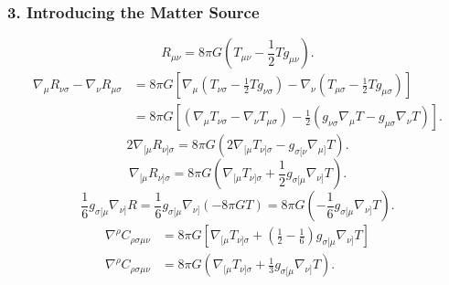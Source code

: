 \documentclass[11pt, a4paper]{report}
\begin{document}
\subsubsection*{3. Introducing the Matter Source}
\begin{equation}
R_{\mu\nu} = 8\pi G \left( T_{\mu\nu} - \frac{1}{2}T g_{\mu\nu} \right).
\end{equation}
\begin{align}
\nabla_{\mu} R_{\nu\sigma} - \nabla_{\nu} R_{\mu\sigma} &= 8\pi G \left[ \nabla_{\mu} \left( T_{\nu\sigma} - \frac{1}{2}T g_{\nu\sigma} \right) - \nabla_{\nu} \left( T_{\mu\sigma} - \frac{1}{2}T g_{\mu\sigma} \right) \right] \nonumber \\
&= 8\pi G \left[ \left( \nabla_{\mu}T_{\nu\sigma} - \nabla_{\nu}T_{\mu\sigma} \right) - \frac{1}{2} \left( g_{\nu\sigma}\nabla_{\mu}T - g_{\mu\sigma}\nabla_{\nu}T \right) \right].
\end{align}
\begin{equation}
2 \nabla_{[\mu} R_{\nu]\sigma} = 8\pi G \left( 2 \nabla_{[\mu} T_{\nu]\sigma} - g_{\sigma[\nu} \nabla_{\mu]} T \right).
\end{equation}
\begin{equation}
\label{eq:ricci_matter_sub}
\nabla_{[\mu} R_{\nu]\sigma} = 8\pi G \left( \nabla_{[\mu} T_{\nu]\sigma} + \frac{1}{2} g_{\sigma[\mu} \nabla_{\nu]} T \right).
\end{equation}
\begin{equation}
\label{eq:scalar_matter_sub}
\frac{1}{6} g_{\sigma[\mu} \nabla_{\nu]} R = \frac{1}{6} g_{\sigma[\mu} \nabla_{\nu]} (-8\pi G T) = 8\pi G \left( -\frac{1}{6} g_{\sigma[\mu} \nabla_{\nu]} T \right).
\end{equation}
\begin{align}
\nabla^{\rho}C_{\rho\sigma\mu\nu} &= 8\pi G \left[ \nabla_{[\mu} T_{\nu]\sigma} + \left( \frac{1}{2} - \frac{1}{6} \right) g_{\sigma[\mu} \nabla_{\nu]} T \right] \nonumber \\
\nabla^{\rho}C_{\rho\sigma\mu\nu} &= 8\pi G \left( \nabla_{[\mu} T_{\nu]\sigma} + \frac{1}{3} g_{\sigma[\mu} \nabla_{\nu]} T \right).
\end{align}
\end{document}
